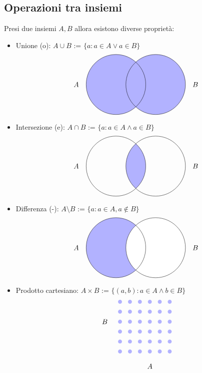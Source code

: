 \documentclass[a4paper,12pt]{article}
\begin{document}
	\subsection{Operazioni tra insiemi}	
	Presi due insiemi $A, B$ allora esistono diverse proprietà:
	\begin{itemize}
		\item Unione (o): $A \cup B$ := $\{a : a\in A \vee a \in B\}$
		\[
		\begin{tikzpicture}
			
			\begin{scope}
				\clip (0,0) circle (1.5cm);
				\fill[blue!30] (-2,-2) rectangle (4,2);
			\end{scope}
			
			\begin{scope}
				\clip (2,0) circle (1.5cm);
				\fill[blue!30] (-2,-2) rectangle (4,2);
			\end{scope}
			
			\draw (0,0) circle (1.5cm);
			\node at (-2,0) {$A$};
			\draw (2,0) circle (1.5cm);
			\node at (4,0) {$B$};
		\end{tikzpicture}
		\]
		\item Intersezione (e): $A \cap B$ := $\{a : a\in A \wedge a \in B\}$ 
		\[
		\begin{tikzpicture}
			\begin{scope}
				\clip (0,0) circle (1.5cm);
				\fill[blue!30] (2,0) circle (1.5cm);
			\end{scope}
			
			\draw (0,0) circle (1.5cm);
			\node at (-2,0) {$A$};
			\draw (2,0) circle (1.5cm);
			\node at (4,0) {$B$};		
		\end{tikzpicture}
		\]
		\item Differenza (-): $A \setminus B $ :=  $\{a : a \in A, a\not \in B\}$
		\[
		\begin{tikzpicture}
			\begin{scope}
				\clip (0,0) circle (1.5cm);
				\fill[blue!30] (-2,-2) rectangle (2,2);
			\end{scope}
			
			\begin{scope}
				\clip (2,0) circle (1.5cm);
				\fill[white] (-2,-2) rectangle (4,2);
			\end{scope}
			
			
			\draw (0,0) circle (1.5cm);
			\node at (-2,0) {$A$};
			\draw (2,0) circle (1.5cm);
			\node at (4,0) {$B$};	
		\end{tikzpicture}
		\]
		\item Prodotto cartesiano: $A \times B$ := $\{(a, b) : a \in A \wedge b \in B\}$
		\[
		\begin{tikzpicture}
			\foreach \x in {1/2,2/2,3/2,4/2,5/2,6/2} {
				\foreach \y in {1/2,2/2,3/2,4/2,5/2,6/2} {
					\fill[blue!30] (\x,\y) circle (0.1cm);
				}
			}
			
			\node[left] at (0,2) {$B$};
			\node[below] at (2,0) {$A$};
		\end{tikzpicture}
		\]
	\end{itemize}
	
\end{document}
